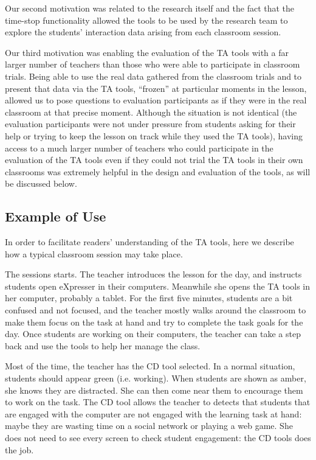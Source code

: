 Our second motivation was related to the research itself and the fact
that the time-stop functionality allowed the tools to be used by
the research team to explore the students' interaction data arising
from each classroom session.

Our third motivation was enabling the evaluation of the TA tools with
a far larger number of teachers than those who were able to
participate in classroom trials. Being able to use the real data
gathered from the classroom trials and to present that data via the TA
tools, “frozen” at particular moments in the lesson, allowed us to
pose questions to evaluation participants as if they were in the real
classroom at that precise moment. Although the situation is not
identical (the evaluation participants were not under pressure from
students asking for their help or trying to keep the lesson on track
while they used the TA tools), having access to a much larger number
of teachers who could participate in the evaluation of the TA tools
even if they could not trial the TA tools in their own classrooms was
extremely helpful in the design and evaluation of the tools, as
will be discussed below.

\subsection{Example of Use}
\label{sec:example-use}

In order to facilitate readers' understanding of the TA tools, here we 
describe how a typical classroom session may take place. 

The sessions starts. The teacher introduces the lesson for the day,
and instructs students open eXpresser in their computers. Meanwhile
she opens the TA tools in her computer, probably a tablet. For the
first five minutes, students are a bit confused and not focused, and
the teacher mostly walks around the classroom to make them focus on
the task at hand and try to complete the task goals for the day. Once
students are working on their computers, the teacher can take a step
back and use the tools to help her manage the class.

Most of the time, the teacher has the CD tool selected. In a normal
situation, students should appear green (i.e. working). When students
are shown as amber, she knows they are distracted. She can then come
near them to encourage them to work on the task. The CD tool allows
the teacher to detects that students that are engaged with the
computer are not engaged with the learning task at hand: maybe they
are wasting time on a social network or playing a web game. She does
not need to see every screen to check student engagement: the CD tools
does the job.

